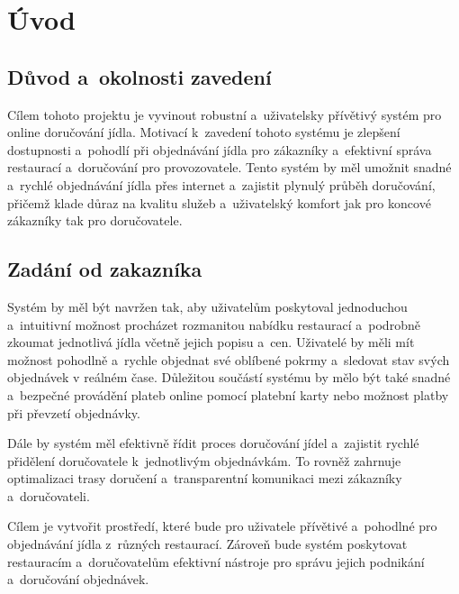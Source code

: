 \section{Úvod}
    \sloppy
    \subsection{Důvod a~okolnosti zavedení}
	
    Cílem tohoto projektu je vyvinout robustní a~uživatelsky přívětivý systém pro online doručování jídla. Motivací k~zavedení tohoto systému je zlepšení dostupnosti a~pohodlí při objednávání jídla pro zákazníky a~efektivní správa restaurací a~doručování pro provozovatele. Tento systém by měl umožnit snadné a~rychlé objednávání jídla přes internet a~zajistit plynulý průběh doručování, přičemž klade důraz na kvalitu služeb a~uživatelský komfort jak pro koncové zákazníky tak pro doručovatele.
	 
    \subsection{Zadání od zakazníka}
    Systém by měl být navržen tak, aby uživatelům poskytoval jednoduchou a~intuitivní možnost procházet rozmanitou nabídku restaurací a~podrobně zkoumat jednotlivá jídla včetně jejich popisu a~cen. Uživatelé by měli mít možnost pohodlně a~rychle objednat své oblíbené pokrmy a~sledovat stav svých objednávek v reálném čase. Důležitou součástí systému by mělo být také snadné a~bezpečné provádění plateb online pomocí platební karty nebo možnost platby při převzetí objednávky.
    
    Dále by systém měl efektivně řídit proces doručování jídel a~zajistit rychlé přidělení doručovatele k~jednotlivým objednávkám. To rovněž zahrnuje optimalizaci trasy doručení a~transparentní komunikaci mezi zákazníky a~doručovateli.
    
    Cílem je vytvořit prostředí, které bude pro uživatele přívětivé a~pohodlné pro objednávání jídla z~různých restaurací. Zároveň bude systém poskytovat restauracím a~doručovatelům efektivní nástroje pro správu jejich podnikání a~doručování objednávek.

\pagebreak
